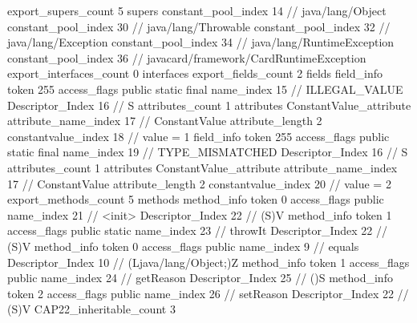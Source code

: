{{{			export_supers_count	5
			supers {
				constant_pool_index	14		// java/lang/Object
				constant_pool_index	30		// java/lang/Throwable
				constant_pool_index	32		// java/lang/Exception
				constant_pool_index	34		// java/lang/RuntimeException
				constant_pool_index	36		// javacard/framework/CardRuntimeException
			}
			export_interfaces_count	0
			interfaces {
			}
			export_fields_count	2
			fields {
			field_info {
				token	255
				access_flags	public static final
				name_index	15		// ILLEGAL_VALUE
				Descriptor_Index	16		// S
				attributes_count	1
				attributes {
				ConstantValue_attribute {
					attribute_name_index	17		// ConstantValue
					attribute_length	2
					constantvalue_index	18		// value = 1
				}
				}
			}
			field_info {
				token	255
				access_flags	public static final
				name_index	19		// TYPE_MISMATCHED
				Descriptor_Index	16		// S
				attributes_count	1
				attributes {
				ConstantValue_attribute {
					attribute_name_index	17		// ConstantValue
					attribute_length	2
					constantvalue_index	20		// value = 2
				}
				}
			}
			}
			export_methods_count	5
			methods {
				method_info {
					token	0
					access_flags	public
					name_index	21		// <init>
					Descriptor_Index	22		// (S)V
				}
				method_info {
					token	1
					access_flags	public static
					name_index	23		// throwIt
					Descriptor_Index	22		// (S)V
				}
				method_info {
					token	0
					access_flags	public
					name_index	9		// equals
					Descriptor_Index	10		// (Ljava/lang/Object;)Z
				}
				method_info {
					token	1
					access_flags	public
					name_index	24		// getReason
					Descriptor_Index	25		// ()S
				}
				method_info {
					token	2
					access_flags	public
					name_index	26		// setReason
					Descriptor_Index	22		// (S)V
				}
			}
			CAP22_inheritable_count	3
		}
	}
}

